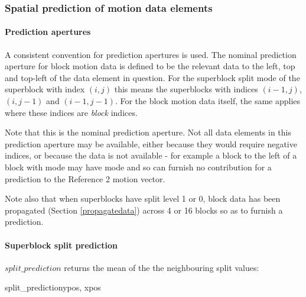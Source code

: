 \subsubsection{Spatial prediction of motion data elements}

\label{spatialprediction}

\paragraph{Prediction apertures}

A consistent convention for prediction apertures is used. The nominal prediction 
aperture for block motion data is defined to be the relevant data to the left, top
and top-left of the data element in question. For the superblock split mode of 
the superblock with index $(i,j)$ this means the superblocks with indices $(i-1,j)$,
$(i,j-1)$ and $(i-1,j-1)$. For the block motion data itself, the same applies where these
indices are {\em block} indices. 

Note that this is the nominal prediction aperture. Not all data elements in this prediction
aperture may be available, either because they would require negative indices, or because
the data is not available - for example a block to the left of a block with mode \RefTwoOnly
may have mode \RefOneOnly and so can furnish no contribution for a prediction to the
Reference 2 motion vector.

Note also that when superblocks have split level 1 or 0, block data has been propagated
(Section \ref{propagatedata}) across 4 or 16 blocks so as to furnish a prediction. 

\paragraph{Superblock split prediction \\}
\label{splitprediction}

$split\_prediction$ returns the mean of the the neighbouring split values:

\begin{pseudo}{split\_prediction}{ypos, xpos}
    \bsRET{\SBSplit[ypos][xpos-1]}
    \bsRET{\SBSplit[ypos-1][xpos]}
\bsEND

\end{pseudo}

